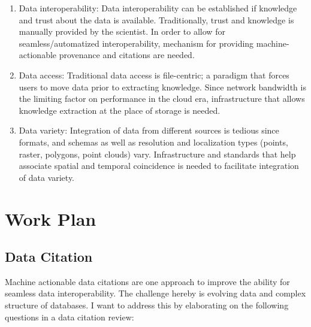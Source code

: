 \documentclass[a4paper,10pt]{article}
\begin{document}
\begin{enumerate}
 \item Data interoperability: 
       Data interoperability can be established if knowledge and trust about the data is available. Traditionally, trust and knowledge is manually provided by the scientist. In order to allow for seamless/automatized interoperability, mechanism for providing machine-actionable provenance and citations are needed.
 \item Data access: 
       Traditional data access is file-centric; a paradigm that forces users to move data prior to extracting knowledge. Since network bandwidth is the limiting factor on performance in the cloud era, infrastructure that allows knowledge extraction at the place of storage is needed.
 \item Data variety: 
       Integration of data from different sources is tedious since formats, and schemas as well as resolution and localization types (points, raster, polygons, point clouds) vary. Infrastructure and standards that help associate spatial and temporal coincidence is needed to facilitate integration of data variety.
\end{enumerate} 


\newpage


\section{Work Plan}

\subsection{Data Citation}

Machine actionable data citations are one approach to improve the ability for seamless data interoperability. The challenge hereby is evolving data and complex structure of databases. I want to address this by elaborating on the following questions in a data citation review:
\end{document}
